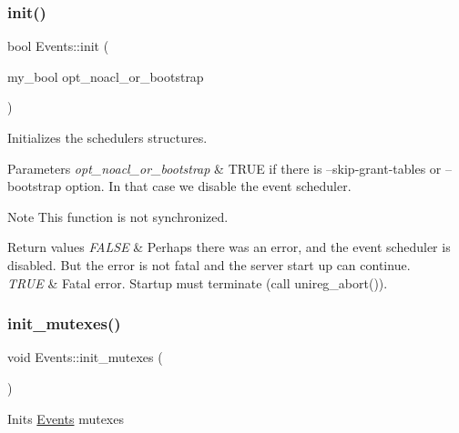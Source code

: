 \subsubsection{\texorpdfstring{init()}{init()}}
{\footnotesize\ttfamily bool Events\+::init (\begin{DoxyParamCaption}\item[{my\+\_\+bool}]{opt\+\_\+noacl\+\_\+or\+\_\+bootstrap }\end{DoxyParamCaption})\hspace{0.3cm}{\ttfamily [static]}}

Initializes the scheduler\textquotesingle{}s structures.


\begin{DoxyParams}{Parameters}
{\em opt\+\_\+noacl\+\_\+or\+\_\+bootstrap} & T\+R\+UE if there is --skip-\/grant-\/tables or --bootstrap option. In that case we disable the event scheduler.\\
\hline
\end{DoxyParams}
\begin{DoxyNote}{Note}
This function is not synchronized.
\end{DoxyNote}

\begin{DoxyRetVals}{Return values}
{\em F\+A\+L\+SE} & Perhaps there was an error, and the event scheduler is disabled. But the error is not fatal and the server start up can continue. \\
\hline
{\em T\+R\+UE} & Fatal error. Startup must terminate (call unireg\+\_\+abort()). \\
\hline
\end{DoxyRetVals}
\mbox{\label{group__Event__Scheduler_gaa26988f7ec7f5d0053af28a5d8586236}} 
\subsubsection{\texorpdfstring{init\+\_\+mutexes()}{init\_mutexes()}}
{\footnotesize\ttfamily void Events\+::init\+\_\+mutexes (\begin{DoxyParamCaption}{ }\end{DoxyParamCaption})\hspace{0.3cm}{\ttfamily [static]}}

Inits \mbox{\hyperlink{classEvents}{Events}} mutexes


